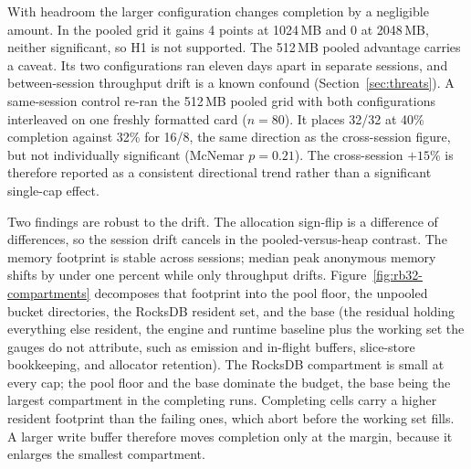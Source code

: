 With headroom the larger configuration changes completion by a negligible amount.
In the pooled grid it gains 4 points at 1024\,MB and 0 at 2048\,MB, neither significant, so H1 is not supported.
The 512\,MB pooled advantage carries a caveat.
Its two configurations ran eleven days apart in separate sessions, and between-session throughput drift is a known confound (Section~\ref{sec:threats}).
A same-session control re-ran the 512\,MB pooled grid with both configurations interleaved on one freshly formatted card ($n = 80$).
It places 32/32 at 40\% completion against 32\% for 16/8, the same direction as the cross-session figure, but not individually significant (McNemar $p = 0.21$).
The cross-session $+15\%$ is therefore reported as a consistent directional trend rather than a significant single-cap effect.

Two findings are robust to the drift.
The allocation sign-flip is a difference of differences, so the session drift cancels in the pooled-versus-heap contrast.
The memory footprint is stable across sessions; median peak anonymous memory shifts by under one percent while only throughput drifts.
Figure~\ref{fig:rb32-compartments} decomposes that footprint into the pool floor, the unpooled bucket directories, the RocksDB resident set, and the base (the residual holding everything else resident, the engine and runtime baseline plus the working set the gauges do not attribute, such as emission and in-flight buffers, slice-store bookkeeping, and allocator retention).
The RocksDB compartment is small at every cap; the pool floor and the base dominate the budget, the base being the largest compartment in the completing runs.
Completing cells carry a higher resident footprint than the failing ones, which abort before the working set fills.
A larger write buffer therefore moves completion only at the margin, because it enlarges the smallest compartment.

